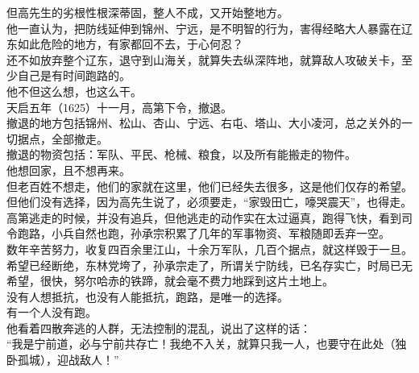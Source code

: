 \begin{multicols}{\theparacolNo}
但高先生的劣根性根深蒂固，整人不成，又开始整地方。\\

他一直认为，把防线延伸到锦州、宁远，是不明智的行为，害得经略大人暴露在辽东如此危险的地方，有家都回不去，于心何忍？\\

还不如放弃整个辽东，退守到山海关，就算失去纵深阵地，就算敌人攻破关卡，至少自己是有时间跑路的。\\

他不但这么想，也这么干。\\

天启五年（1625）十一月，高第下令，撤退。\\

撤退的地方包括锦州、松山、杏山、宁远、右屯、塔山、大小凌河，总之关外的一切据点，全部撤走。\\

撤退的物资包括：军队、平民、枪械、粮食，以及所有能搬走的物件。\\

他想回家，且不想再来。\\

但老百姓不想走，他们的家就在这里，他们已经失去很多，这是他们仅存的希望。\\

但他们没有选择，因为高先生说了，必须要走，“家毁田亡，嚎哭震天”，也得走。\\

高第逃走的时候，并没有追兵，但他逃走的动作实在太过逼真，跑得飞快，看到司令跑路，小兵自然也跑，孙承宗积累了几年的军事物资、军粮随即丢弃一空。\\

数年辛苦努力，收复四百余里江山，十余万军队，几百个据点，就这样毁于一旦。\\

希望已经断绝，东林党垮了，孙承宗走了，所谓关宁防线，已名存实亡，时局已无希望，很快，努尔哈赤的铁蹄，就会毫不费力地踩到这片土地上。\\

没有人想抵抗，也没有人能抵抗，跑路，是唯一的选择。\\

有一个人没有跑。\\

他看着四散奔逃的人群，无法控制的混乱，说出了这样的话：\\

“我是宁前道，必与宁前共存亡！我绝不入关，就算只我一人，也要守在此处（独卧孤城），迎战敌人！”\\


\end{multicols}

